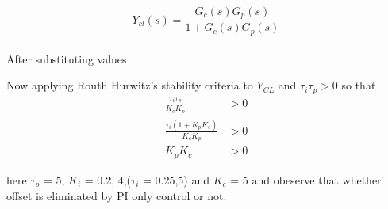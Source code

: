 \message{ !name(lab1.tex)}\documentclass[a4paper,12pt,openany]{book}
\begin{document}
\begin{equation}
  Y_{cl}(s) = \frac{G_c(s)G_p(s)}{1 + {G_c(s)G_p(s)}}
\end{equation}\pagebreak
\\
  After substituting values
\begin{center}
  \end{center}
  Now applying Routh Hurwitz's stability criteria to $Y_{CL}$ and $\tau_i \tau_p
  > 0$ so that
 \begin{align*}
    \frac{\tau_i \tau_p}{K_cK_p} &> 0 \\
    \frac{\tau_i(1+K_pK_c)}{K_cK_p} &> 0 \\
    K_p K_c &> 0    
 \end{align*}

here $\tau_p$ = 5, $K_i$ = 0.2, 4,($\tau_i$ = 0.25,5) and $K_c$ = 5 and obeserve that whether offset is
eliminated by PI only control or not.
\end{document}
